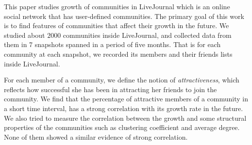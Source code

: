 This paper studies growth of communities in LiveJournal which is  an online social network that has 
user-defined communities. The primary goal of this work is to find features of communities that affect their growth in the future.  We studied about $2000$ communities  inside LiveJournal, and collected data from them in 7 snapshots spanned in a period of five months.  That is for each community at each snapshot, we recorded its members and their friends lists inside LiveJournal.

For each member of a community, we define the notion of  \emph{attractiveness}, which reflects how successful she has been in attracting her friends to join the community. We find that the percentage of attractive members of a community in a short time interval, has a strong correlation with its growth rate in the future. We also tried to measure the correlation between the growth and some structural properties of the communities such as  clustering coefficient and average degree. None of them showed a similar evidence of strong correlation.